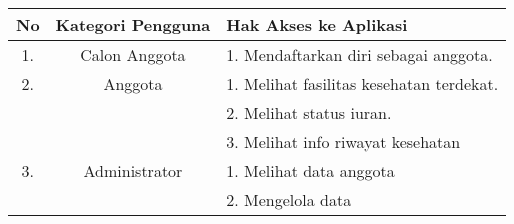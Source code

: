 \begin{table}[h]
		\centering
		\begin{tabular}{|c | c | l |}
			\hline
			No	& Kategori Pengguna	& Hak Akses ke Aplikasi\\ 						
			\hline
			1.	& Calon Anggota		& 1. Mendaftarkan diri sebagai anggota.\\			
			\hline
			2.	& Anggota			& 1. Melihat fasilitas kesehatan terdekat.\\		
				&					& 2. Melihat status iuran.\\						
				&					& 3. Melihat info riwayat kesehatan\\
			\hline
			3. 	& Administrator		& 1. Melihat data anggota\\
				&					& 2. Mengelola data\\
			\hline
		\end{tabular}
	\end{table}